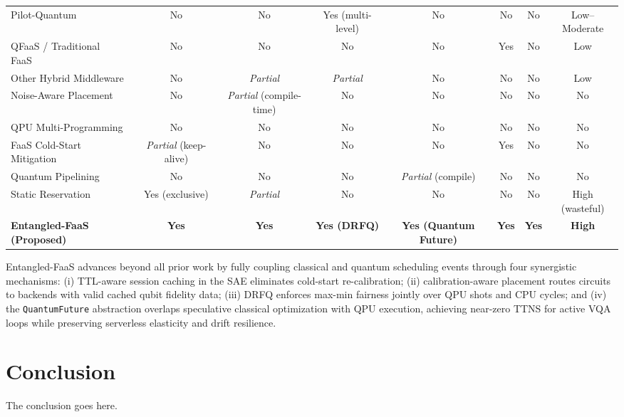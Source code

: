 \documentclass[conference]{IEEEtran}
\begin{document}
\begin{table}
{\begin{tabular}{lccccccc}
Pilot-Quantum~\cite{mantha_pilot_quantum_2024} & No & No & Yes (multi-level) & No & No & No & Low–Moderate \\
QFaaS / Traditional FaaS~\cite{nguyen_qfaas_2024,jonas2019cloud} & No & No & No & No & Yes & No & Low \\
Other Hybrid Middleware~\cite{faro_middleware_quantum_2023,weder_analysis_rewrite_2022} & No & \textit{Partial} & \textit{Partial} & No & No & No & Low \\
Noise-Aware Placement~\cite{murali2019noise} & No & \textit{Partial} (compile-time) & No & No & No & No & No \\
QPU Multi-Programming~\cite{ravi2021quantum} & No & No & No & No & No & No & No \\
FaaS Cold-Start Mitigation~\cite{shahrad2020serverless,gunasekaran2020fifer} & \textit{Partial} (keep-alive) & No & No & No & Yes & No & No \\
Quantum Pipelining~\cite{shi2020resource} & No & No & No & \textit{Partial} (compile) & No & No & No \\
Static Reservation & Yes (exclusive) & \textit{Partial} & No & No & No & No & High (wasteful) \\ 
\midrule
\rowcolor[rgb]{0.678,0.839,0.678} \textbf{Entangled-FaaS (Proposed)} & \textbf{Yes} & \textbf{Yes} & \textbf{Yes (DRFQ)} & \textbf{Yes (Quantum Future)} & \textbf{Yes} & \textbf{Yes} & \textbf{High} \\
\bottomrule
\end{tabular}
}
\end{table}

Entangled-FaaS advances beyond all prior work by fully coupling
classical and quantum scheduling events through four synergistic
mechanisms: (i) TTL-aware session caching in the SAE eliminates
cold-start re-calibration; (ii) calibration-aware placement routes
circuits to backends with valid cached qubit fidelity data;
(iii) DRFQ enforces max-min fairness jointly over QPU shots and CPU
cycles; and (iv) the \texttt{QuantumFuture} abstraction overlaps
speculative classical optimization with QPU execution, achieving
near-zero TTNS for active VQA loops while preserving serverless
elasticity and drift resilience.

\section{Conclusion}
The conclusion goes here.





\end{document}
